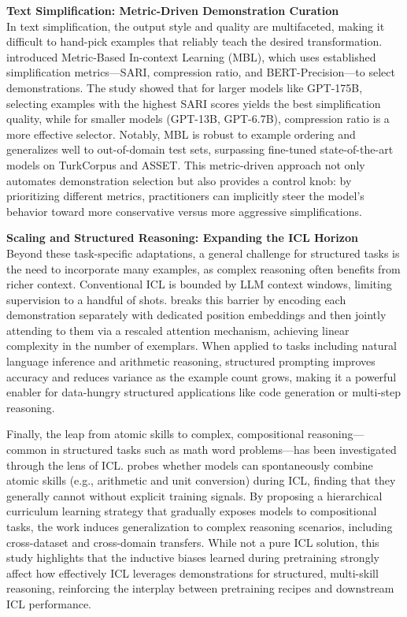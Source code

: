 \documentclass[11pt]{article}
\begin{document}
\textbf{Text Simplification: Metric-Driven Demonstration Curation}\\
In text simplification, the output style and quality are multifaceted, making it difficult to hand-pick examples that reliably teach the desired transformation. \cite{ref170} introduced Metric-Based In-context Learning (MBL), which uses established simplification metrics---SARI, compression ratio, and BERT-Precision---to select demonstrations. The study showed that for larger models like GPT-175B, selecting examples with the highest SARI scores yields the best simplification quality, while for smaller models (GPT-13B, GPT-6.7B), compression ratio is a more effective selector. Notably, MBL is robust to example ordering and generalizes well to out-of-domain test sets, surpassing fine-tuned state-of-the-art models on TurkCorpus and ASSET. This metric-driven approach not only automates demonstration selection but also provides a control knob: by prioritizing different metrics, practitioners can implicitly steer the model's behavior toward more conservative versus more aggressive simplifications.

\textbf{Scaling and Structured Reasoning: Expanding the ICL Horizon}\\
Beyond these task-specific adaptations, a general challenge for structured tasks is the need to incorporate many examples, as complex reasoning often benefits from richer context. Conventional ICL is bounded by LLM context windows, limiting supervision to a handful of shots. \cite{ref171} breaks this barrier by encoding each demonstration separately with dedicated position embeddings and then jointly attending to them via a rescaled attention mechanism, achieving linear complexity in the number of exemplars. When applied to tasks including natural language inference and arithmetic reasoning, structured prompting improves accuracy and reduces variance as the example count grows, making it a powerful enabler for data-hungry structured applications like code generation or multi-step reasoning.

Finally, the leap from atomic skills to complex, compositional reasoning---common in structured tasks such as math word problems---has been investigated through the lens of ICL. \cite{ref172} probes whether models can spontaneously combine atomic skills (e.g., arithmetic and unit conversion) during ICL, finding that they generally cannot without explicit training signals. By proposing a hierarchical curriculum learning strategy that gradually exposes models to compositional tasks, the work induces generalization to complex reasoning scenarios, including cross-dataset and cross-domain transfers. While not a pure ICL solution, this study highlights that the inductive biases learned during pretraining strongly affect how effectively ICL leverages demonstrations for structured, multi-skill reasoning, reinforcing the interplay between pretraining recipes and downstream ICL performance.
\end{document}
